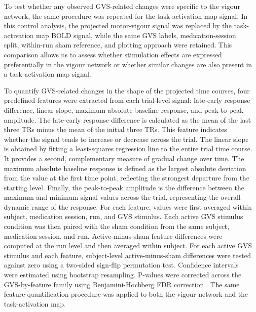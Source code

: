 \documentclass[utf8]{FrontiersinHarvard}
\begin{document}
To test whether any observed GVS-related changes were specific to the vigour network, the same procedure was repeated for the task-activation map signal. In this control analysis, the projected motor-vigour signal was replaced by the task-activation map BOLD signal, while the same GVS labels, medication-session split, within-run sham reference, and plotting approach were retained. This comparison allows us to assess whether stimulation effects are expressed preferentially in the vigour network or whether similar changes are also present in a task-activation map signal.

To quantify GVS-related changes in the shape of the projected time courses, four predefined features were extracted from each trial-level signal: late-early response difference, linear slope, maximum absolute baseline response, and peak-to-peak amplitude. The late-early response difference is calculated as the mean of the last three TRs minus the mean of the initial three TRs. This feature indicates whether the signal tends to increase or decrease across the trial. The linear slope is obtained by fitting a least-squares regression line to the entire trial time course. It provides a second, complementary measure of gradual change over time. The maximum absolute baseline response is defined as the largest absolute deviation from the value at the first time point, reflecting the strongest departure from the starting level. Finally, the peak-to-peak amplitude is the difference between the maximum and minimum signal values across the trial, representing the overall dynamic range of the response. For each feature, values were first averaged within subject, medication session, run, and GVS stimulus. Each active GVS stimulus condition was then paired with the sham condition from the same subject, medication session, and run. Active-minus-sham feature differences were computed at the run level and then averaged within subject. For each active GVS stimulus and each feature, subject-level active-minus-sham differences were tested against zero using a two-sided sign-flip permutation test. Confidence intervals were estimated using bootstrap resampling. P-values were corrected across the GVS-by-feature family using Benjamini-Hochberg FDR correction \citep{benjamini1995controlling}. The same feature-quantification procedure was applied to both the vigour network and the task-activation map.
\end{document}

